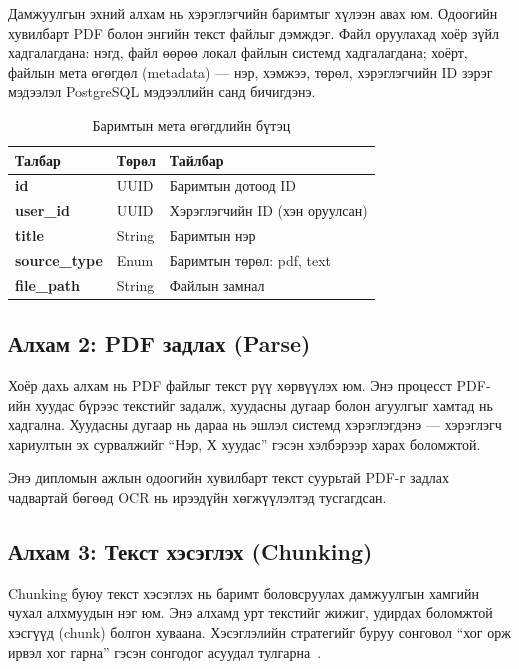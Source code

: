 \documentclass[12pt,A4]{report}
\begin{document}
Дамжуулгын эхний алхам нь хэрэглэгчийн баримтыг хүлээн авах юм. Одоогийн хувилбарт PDF болон энгийн текст файлыг дэмждэг. Файл оруулахад хоёр зүйл хадгалагдана: нэгд, файл өөрөө локал файлын системд хадгалагдана; хоёрт, файлын мета өгөгдөл (metadata) --- нэр, хэмжээ, төрөл, хэрэглэгчийн ID зэрэг мэдээлэл PostgreSQL мэдээллийн санд бичигдэнэ.

\begin{table}[h!]
\centering
\caption{Баримтын мета өгөгдлийн бүтэц}
\label{tab:document_meta}
\begin{tabularx}{\textwidth}{>{\bfseries\ttfamily}l l X}
\toprule
\textbf{Талбар} & \textbf{Төрөл} & \textbf{Тайлбар} \\
\midrule
\rowcolor{lightbg}
id & UUID & Баримтын дотоод ID \\
user\_id & UUID & Хэрэглэгчийн ID (хэн оруулсан) \\
\rowcolor{lightbg}
title & String & Баримтын нэр \\
source\_type & Enum & Баримтын төрөл: pdf, text \\
\rowcolor{lightbg}
file\_path & String & Файлын замнал \\
\bottomrule
\end{tabularx}
\end{table}

\subsection{Алхам 2: PDF задлах (Parse)}

Хоёр дахь алхам нь PDF файлыг текст рүү хөрвүүлэх юм. Энэ процесст PDF-ийн хуудас бүрээс текстийг задалж, хуудасны дугаар болон агуулгыг хамтад нь хадгална. Хуудасны дугаар нь дараа нь эшлэл системд хэрэглэгдэнэ --- хэрэглэгч хариултын эх сурвалжийг ``Нэр, Х хуудас'' гэсэн хэлбэрээр харах боломжтой.

Энэ дипломын ажлын одоогийн хувилбарт текст суурьтай PDF-г задлах чадвартай бөгөөд OCR нь ирээдүйн хөгжүүлэлтэд тусгагдсан.

\subsection{Алхам 3: Текст хэсэглэх (Chunking)}

Chunking буюу текст хэсэглэх нь баримт боловсруулах дамжуулгын хамгийн чухал алхмуудын нэг юм. Энэ алхамд урт текстийг жижиг, удирдах боломжтой хэсгүүд (chunk) болгон хуваана. Хэсэглэлийн стратегийг буруу сонговол ``хог орж ирвэл хог гарна'' гэсэн сонгодог асуудал тулгарна~\cite{langcopilot2025}.
\end{document}
